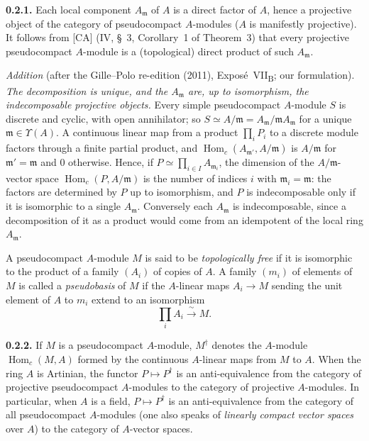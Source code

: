 
\medskip
\noindent\textbf{0.2.1.}
\label{sga3:VIIB:0.2.1}
Each local component \(A_{\mathfrak m}\) of \(A\) is a direct factor
of \(A\), hence a projective object of the category of pseudocompact
\(A\)-modules (\(A\) is manifestly projective). It follows from [CA] (IV,
\S~3, Corollary~1 of Theorem~3) that every projective pseudocompact
\(A\)-module is a (topological) direct product of such \(A_{\mathfrak m}\).

\medskip\noindent
\emph{Addition} (after the Gille--Polo re-edition (2011), Expos\'e~VII\textsubscript{B}; our formulation).
\emph{The decomposition is unique, and the \(A_{\mathfrak m}\) are, up to isomorphism, the indecomposable
projective objects.} Every simple pseudocompact \(A\)-module \(S\) is discrete and cyclic, with open
annihilator; so \(S\simeq A/\mathfrak m=A_{\mathfrak m}/\mathfrak mA_{\mathfrak m}\) for a unique
\(\mathfrak m\in\Upsilon(A)\). A continuous linear map from a product \(\prod_iP_i\) to a discrete module
factors through a finite partial product, and \(\operatorname{Hom}_c(A_{\mathfrak m'},A/\mathfrak m)\) is
\(A/\mathfrak m\) for \(\mathfrak m'=\mathfrak m\) and \(0\) otherwise. Hence, if
\(P\simeq\prod_{i\in I}A_{\mathfrak m_i}\), the dimension of the \(A/\mathfrak m\)-vector space
\(\operatorname{Hom}_c(P,A/\mathfrak m)\) is the number of indices \(i\) with \(\mathfrak m_i=\mathfrak m\):
the factors are determined by \(P\) up to isomorphism, and \(P\) is indecomposable only if it is
isomorphic to a single \(A_{\mathfrak m}\). Conversely each \(A_{\mathfrak m}\) is indecomposable, since a
decomposition of it as a product would come from an idempotent of the local ring \(A_{\mathfrak m}\).

A pseudocompact \(A\)-module \(M\) is said to be
\emph{topologically free} if it is isomorphic to the product of a
family \((A_i)\) of copies of \(A\). A family \((m_i)\) of elements of
\(M\) is called a \emph{pseudobasis} of \(M\) if the \(A\)-linear maps
\(A_i\longrightarrow M\) sending the unit element of \(A\) to
\(m_i\) extend to an isomorphism
\[
  \prod_i A_i\xrightarrow{\ \sim\ }M.
\]

\medskip
\noindent\textbf{0.2.2.}
\label{sga3:VIIB:0.2.2}
If \(M\) is a pseudocompact \(A\)-module, \(M^\dagger\) denotes the
\(A\)-module \(\operatorname{Hom}_c(M,A)\) formed by the continuous
\(A\)-linear maps from \(M\) to \(A\). When the ring \(A\) is Artinian, the
functor \(P\mapsto P^\dagger\) is an anti-equivalence from the category of
projective pseudocompact \(A\)-modules to the category of projective
\(A\)-modules. In particular, when \(A\) is a field, \(P\mapsto P^\dagger\)
is an anti-equivalence from the category of all pseudocompact \(A\)-modules
(one also speaks of \emph{linearly compact vector spaces} over \(A\)) to
the category of \(A\)-vector spaces.

